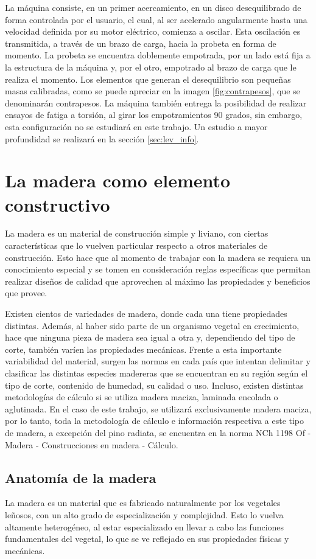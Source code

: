 La máquina consiste, en un primer acercamiento, en un disco desequilibrado de forma controlada por el usuario, el cual, al ser acelerado angularmente hasta una velocidad definida por su motor eléctrico, comienza a oscilar. Esta oscilación es transmitida, a través de un brazo de carga, hacia la probeta en forma de momento. La probeta se encuentra doblemente empotrada, por un lado está fija a la estructura de la máquina y, por el otro, empotrado al brazo de carga que le realiza el momento. Los elementos que generan el desequilibrio son pequeñas masas calibradas, como se puede apreciar en la imagen \ref{fig:contrapesos}, que se denominarán contrapesos. La máquina también entrega la posibilidad de realizar ensayos de fatiga a torsión, al girar los empotramientos 90 grados, sin embargo, esta configuración no se estudiará en este trabajo. Un estudio a mayor profundidad se realizará en la sección \ref{sec:lev_info}.

\section{La madera como elemento constructivo}
La madera es un material de construcción simple y liviano, con ciertas características que lo vuelven particular respecto a otros materiales de construcción. Esto hace que al momento de trabajar con la madera se requiera un conocimiento especial y se tomen en consideración reglas específicas que permitan realizar diseños de calidad que aprovechen al máximo las propiedades y beneficios que provee.

Existen cientos de variedades de madera, donde cada una tiene propiedades distintas. Además, al haber sido parte de un organismo vegetal en crecimiento, hace que ninguna pieza de madera sea igual a otra y, dependiendo del tipo de corte, también varíen las propiedades mecánicas. Frente a esta importante variabilidad del material, surgen las normas en cada país que intentan delimitar y clasificar las distintas especies madereras que se encuentran en su región según el tipo de corte, contenido de humedad, su calidad o uso. Incluso, existen distintas metodologías de cálculo si se utiliza madera maciza, laminada encolada o aglutinada. En el caso de este trabajo, se utilizará exclusivamente madera maciza, por lo tanto, toda la metodología de cálculo e información respectiva a este tipo de madera, a excepción del pino radiata, se encuentra en la norma NCh 1198 Of - Madera - Construcciones en madera - Cálculo.

\subsection{Anatomía de la madera}
La madera es un material que es fabricado naturalmente por los vegetales leñosos, con un alto grado de especialización y complejidad. Esto lo vuelva altamente heterogéneo, al estar especializado en llevar a cabo las funciones fundamentales del vegetal, lo que se ve reflejado en sus propiedades físicas y mecánicas. 


